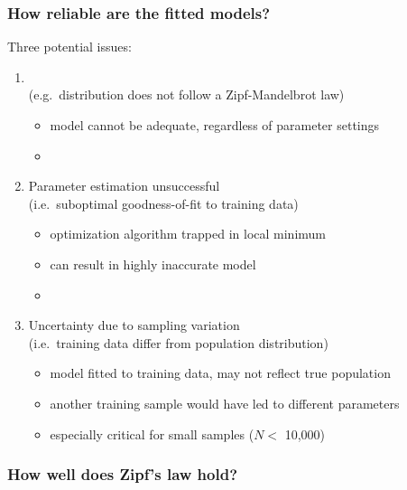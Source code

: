 \documentclass[handout,notes=show,t]{beamer} %
\begin{document}
\begin{frame}
  \frametitle{How reliable are the fitted models?}
  
  Three potential issues:
  \begin{enumerate}
  \item {}\\
    (e.g.\ distribution does not follow a Zipf-Mandelbrot law)
    \begin{itemize}
    \item[\hand] model cannot be adequate, regardless of parameter settings
    \item[]
    \end{itemize}
  \item Parameter estimation unsuccessful\\
    (i.e.\ suboptimal goodness-of-fit to training data)
    \begin{itemize}
    \item[\hand] optimization algorithm trapped in local minimum
    \item[\hand] can result in highly inaccurate model
    \item[]
    \end{itemize}
  \item Uncertainty due to sampling variation\\
    (i.e.\ training data differ from population distribution)
    \begin{itemize}
    \item[\hand] model fitted to training data, may not reflect true population
    \item[\hand] another training sample would have led to different parameters
    \item[\hand] especially critical for small samples ($N < $ 10,000)
    \end{itemize}
  \end{enumerate}
\end{frame}

\begin{frame}[c]
  \frametitle{How well does Zipf's law hold?} 

  \centering
\end{frame}
\end{document}
